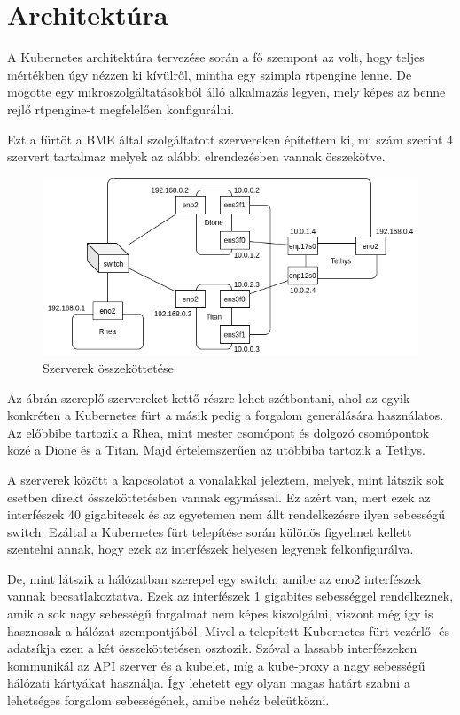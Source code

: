 \chapter{Architektúra}

A Kubernetes architektúra tervezése során a fő szempont az volt, hogy teljes
mértékben úgy nézzen ki kívülről, mintha egy szimpla rtpengine lenne. De 
mögötte egy mikroszolgáltatásokból álló alkalmazás legyen, mely képes
az benne rejlő rtpengine-t megfelelően konfigurálni.

Ezt a fürtöt a BME által szolgáltatott szervereken építettem ki, mi szám szerint
4 szervert tartalmaz melyek az alábbi elrendezésben vannak összekötve.

\begin{figure}[!ht]
	\centering
	\includegraphics[width=1\textwidth, keepaspectratio]{figures/servers.png}
	\caption{Szerverek összeköttetése}
	\label{fig:HVSpaces}
\end{figure}

Az ábrán szereplő szervereket kettő részre lehet szétbontani, ahol az egyik
konkréten a Kubernetes fürt a másik pedig a forgalom generálására használatos.
Az előbbibe tartozik a Rhea, mint mester csomópont és dolgozó csomópontok közé 
a Dione és a Titan. Majd értelemszerűen az utóbbiba tartozik a Tethys. 

A szerverek között a kapcsolatot a vonalakkal jeleztem, melyek, mint látszik
sok esetben direkt összeköttetésben vannak egymással. Ez azért van, mert ezek
az interfészek 40 gigabitesek és az egyetemen nem állt rendelkezésre ilyen 
sebességű switch. Ezáltal a Kubernetes fürt telepítése során különös figyelmet
kellett szentelni annak, hogy ezek az interfészek helyesen legyenek felkonfigurálva.

De, mint látszik a hálózatban szerepel egy switch, amibe az eno2 interfészek vannak
becsatlakoztatva. Ezek az interfészek 1 gigabites sebességgel rendelkeznek, amik
a sok nagy sebességű forgalmat nem képes kiszolgálni, viszont még így is hasznosak
a hálózat szempontjából. Mivel a telepített Kubernetes fürt vezérlő- és adatsíkja
ezen a két összeköttetésen osztozik. Szóval a lassabb interfészeken kommunikál az
API szerver és a kubelet, míg a kube-proxy a nagy sebességű hálózati kártyákat 
használja. Így lehetett egy olyan magas határt szabni a lehetséges forgalom
sebességének, amibe nehéz beleütközni. 


